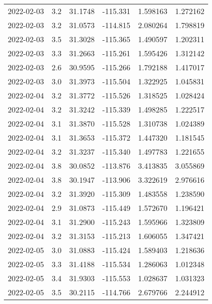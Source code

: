 \begin{tabular}{lrrrrr}
2022-02-03 &       3.2 &  31.1748 &  -115.331 &         1.598163 &         1.272162 \\
2022-02-03 &       3.2 &  31.0573 &  -114.815 &         2.080264 &         1.798819 \\
2022-02-03 &       3.5 &  31.3028 &  -115.365 &         1.490597 &         1.202311 \\
2022-02-03 &       3.3 &  31.2663 &  -115.261 &         1.595426 &         1.312142 \\
2022-02-03 &       2.6 &  30.9595 &  -115.266 &         1.792188 &         1.417017 \\
2022-02-03 &       3.0 &  31.3973 &  -115.504 &         1.322925 &         1.045831 \\
2022-02-04 &       3.2 &  31.3772 &  -115.526 &         1.318525 &         1.028424 \\
2022-02-04 &       3.2 &  31.3242 &  -115.339 &         1.498285 &         1.222517 \\
2022-02-04 &       3.1 &  31.3870 &  -115.528 &         1.310738 &         1.024389 \\
2022-02-04 &       3.1 &  31.3653 &  -115.372 &         1.447320 &         1.181545 \\
2022-02-04 &       3.2 &  31.3237 &  -115.340 &         1.497783 &         1.221655 \\
2022-02-04 &       3.8 &  30.0852 &  -113.876 &         3.413835 &         3.055869 \\
2022-02-04 &       3.8 &  30.1947 &  -113.906 &         3.322619 &         2.976616 \\
2022-02-04 &       3.2 &  31.3920 &  -115.309 &         1.483558 &         1.238590 \\
2022-02-04 &       2.9 &  31.0873 &  -115.449 &         1.572670 &         1.196421 \\
2022-02-04 &       3.1 &  31.2900 &  -115.243 &         1.595966 &         1.323809 \\
2022-02-04 &       3.2 &  31.3153 &  -115.213 &         1.606055 &         1.347421 \\
2022-02-05 &       3.0 &  31.0883 &  -115.424 &         1.589403 &         1.218636 \\
2022-02-05 &       3.3 &  31.4188 &  -115.534 &         1.286063 &         1.012348 \\
2022-02-05 &       3.4 &  31.9303 &  -115.553 &         1.028637 &         1.031323 \\
2022-02-05 &       3.5 &  30.2115 &  -114.766 &         2.679766 &         2.244912 \\

\end{tabular}
